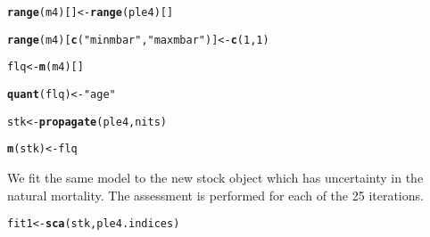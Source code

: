 \documentclass[a4paper,english,10pt]{article}\usepackage[]{graphicx}\usepackage[]{color}
\makeatletter
\newcommand{\hlnum}[1]{\textcolor[rgb]{0.686,0.059,0.569}{#1}}%
\newcommand{\hlstr}[1]{\textcolor[rgb]{0.192,0.494,0.8}{#1}}%
\newcommand{\hlstd}[1]{\textcolor[rgb]{0.345,0.345,0.345}{#1}}%
\newcommand{\hlkwb}[1]{\textcolor[rgb]{0.69,0.353,0.396}{#1}}%
\newcommand{\hlkwd}[1]{\textcolor[rgb]{0.737,0.353,0.396}{\textbf{#1}}}%
\newenvironment{kframe}{%
 \def\at@end@of@kframe{}%
 \ifinner\ifhmode%
  \def\at@end@of@kframe{\end{minipage}}%
  \begin{minipage}{\columnwidth}%
 \fi\fi%
 \def\FrameCommand##1{\hskip\@totalleftmargin \hskip-\fboxsep
 \colorbox{shadecolor}{##1}\hskip-\fboxsep
     \hskip-\linewidth \hskip-\@totalleftmargin \hskip\columnwidth}%
 \MakeFramed {\advance\hsize-\width
   \@totalleftmargin\z@ \linewidth\hsize
   \@setminipage}}%
 {\par\unskip\endMakeFramed%
 \at@end@of@kframe}
\newenvironment{knitrout}{}{} %
\makeatother
\begin{document}
\begin{knitrout}
\begin{kframe}
{\ttfamily\noindent\bfseries{}}\begin{alltt}
\hlkwd{range}\hlstd{(m4)[]} \hlkwb{<-} \hlkwd{range}\hlstd{(ple4)[]}
\end{alltt}


{\ttfamily\noindent\bfseries\color{errorcolor}{\#\# Error: object 'ple4' not found}}\begin{alltt}
\hlkwd{range}\hlstd{(m4)[}\hlkwd{c}\hlstd{(}\hlstr{"minmbar"}\hlstd{,}\hlstr{"maxmbar"}\hlstd{)]}\hlkwb{<-}\hlkwd{c}\hlstd{(}\hlnum{1}\hlstd{,}\hlnum{1}\hlstd{)}
\end{alltt}


{\ttfamily\noindent\bfseries\color{errorcolor}{\#\# Error: object 'm4' not found}}\begin{alltt}
\hlstd{flq} \hlkwb{<-} \hlkwd{m}\hlstd{(m4)[]}
\end{alltt}


{\ttfamily\noindent\bfseries{}}\begin{alltt}
\hlkwd{quant}\hlstd{(flq)} \hlkwb{<-} \hlstr{"age"}
\end{alltt}


{\ttfamily\noindent\bfseries\color{errorcolor}{\#\# Error: object 'flq' not found}}\begin{alltt}
\hlstd{stk} \hlkwb{<-} \hlkwd{propagate}\hlstd{(ple4, nits)}
\end{alltt}


{\ttfamily\noindent\bfseries{}}\begin{alltt}
\hlkwd{m}\hlstd{(stk)} \hlkwb{<-} \hlstd{flq}
\end{alltt}


{\ttfamily\noindent\bfseries\color{errorcolor}{\#\# Error: object 'flq' not found}}\end{kframe}
\end{knitrout}

We fit the same model to the new stock object which has uncertainty in the natural mortality.
The assessment is performed for each of the 25 iterations.

\begin{knitrout}
\color{fgcolor}\begin{kframe}
\begin{alltt}
\hlstd{fit1} \hlkwb{<-} \hlkwd{sca}\hlstd{(stk, ple4.indices)}
\end{alltt}


{\ttfamily\noindent\bfseries{}}\end{kframe}
\end{knitrout}
\end{document}
